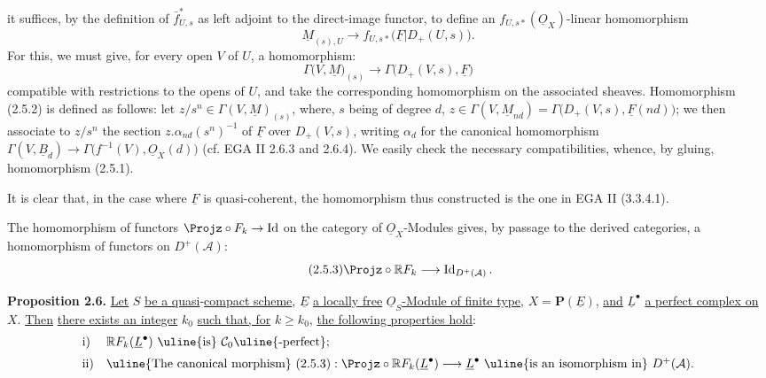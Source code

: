 %
it suffices, by the definition of $\bar f^{*}_{U,s}$ as left adjoint to the direct-image functor, to define an $f_{U,s*}(\underline{O}_X)$-linear homomorphism
\[
  \underline{M}_{(s),U}\longrightarrow f_{U,s*}\bigl(\underline{F}|D_+(U,s)\bigr).
\]
For this, we must give, for every open $V$ of $U$, a homomorphism:
\begin{equation}\tag{2.5.2}
  \Gamma\bigl(V,\underline{M}\bigr)_{(s)}\longrightarrow \Gamma\bigl(D_+(V,s),\underline{F}\bigr)
\end{equation}
compatible with restrictions to the opens of $U$, and take the corresponding homomorphism on the associated sheaves. Homomorphism (2.5.2) is defined as follows: let $z/s^n\in\Gamma(V,\underline{M})_{(s)}$, where, $s$ being of degree $d$, $z\in\Gamma(V,\underline{M}_{nd})=\Gamma\bigl(D_+(V,s),\underline{F}(nd)\bigr)$; we then associate to $z/s^n$ the section $z.\alpha_{nd}(s^n)^{-1}$ of $\underline{F}$ over $D_+(V,s)$, writing $\alpha_d$ for the canonical homomorphism $\Gamma(V,\underline{B}_d)\longrightarrow \Gamma\bigl(f^{-1}(V),\underline{O}_X(d)\bigr)$ (cf. EGA II 2.6.3 and 2.6.4). We easily check the necessary compatibilities, whence, by gluing, homomorphism (2.5.1).

It is clear that, in the case where $\underline{F}$ is quasi-coherent, the homomorphism thus constructed is the one in EGA II (3.3.4.1).

The homomorphism of functors $\Projz\circ F_k\to \operatorname{Id}$ on the category of $\underline{O}_X$-Modules gives, by passage to the derived categories, a homomorphism of functors on $D^+(\mathcal A)$:
\begin{equation}\tag{2.5.3}
  \Projz\circ\mathbb R F_k\longrightarrow \operatorname{Id}_{D^+(\mathcal A)}.
\end{equation}

\textbf{Proposition 2.6.} \uline{Let} $S$ \uline{be a quasi}-\uline{compact scheme}, $\underline{E}$ \uline{a locally free} $\underline{O}_S$\uline{-Module of finite type}, $X=\mathbf P(\underline{E})$, \uline{and} $\underline{L}^{\bullet}$ \uline{a perfect complex on} $X$. \uline{Then} \uline{there exists an integer} $k_0$ \uline{such that, for} $k\geq k_0$, \uline{the following properties hold}:
%
\[
\begin{array}{ll}
\mathrm{i)}& \mathbb R F_k(\underline{L}^{\bullet})\text{ \uline{is} }\mathcal C_0
\text{\uline{-perfect}};\\[2mm]
\mathrm{ii)}& \text{\uline{The canonical morphism} }(2.5.3):
\Projz\circ\mathbb R F_k(\underline{L}^{\bullet})\longrightarrow \underline{L}^{\bullet}
\text{ \uline{is an isomorphism in} }D^+(\mathcal A).
\end{array}
\]

